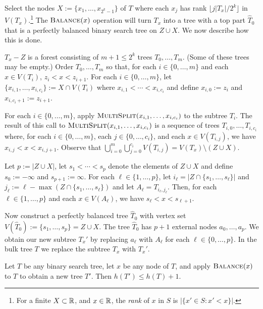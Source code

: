 \documentclass[kpfonts]{patmorin}
\let\le\leqslant
\begin{document}
Select the nodes $X:=\{x_1,\ldots,x_{2^k-1}\}$ of $T$ where each $x_j$ has rank $\lfloor j|T_x|/2^k\rfloor$ in $V(T_x)$.\footnote{For a finite $X\subset\mathbb{R}$, and $x\in\mathbb{R}$, the \emph{rank} of $x$ in $S$ is $|\{x'\in S: x'<x\}|$.}  The $\textsc{Balance}(x)$ operation will turn $T_x$ into a tree with a top part $\hat{T}_0$ that is a perfectly balanced binary search tree on $Z\cup X$.  We now describe how this is done.

$T_x-Z$ is a forest consisting of $m+1\le 2^{k}$ trees $T_0,\ldots,T_m$. (Some of these trees may be empty.)  Order $T_{0},\ldots,T_m$ so that, for each $i\in\{0,\ldots,m\}$ and each $x\in V(T_i)$, $z_i< x < z_{i+1}$.  For each $i\in\{0,\ldots,m\}$, let $\{x_{i,1},\ldots,x_{i,c_i}\}:=X\cap V(T_i)$ where $x_{i,1}<\cdots<x_{i,c_i}$ and define $x_{i,0}:=z_i$ and $x_{i,c_i+1}:=z_{i+1}$.

For each $i\in\{0,\ldots,m\}$, apply $\textsc{MultiSplit}(x_{i,1},\ldots,x_{i,c_i})$ to the subtree $T_i$.  The result of this call to $\textsc{MultiSplit}(x_{i,1},\ldots,x_{i,c_i})$ is a sequence of trees $T_{i,0},\ldots,T_{i,c_i}$ where, for each $i\in\{0,\ldots,m\}$, each $j\in\{0,\ldots,c_i\}$, and each $x\in V(T_{i,j})$, we have $x_{i,j}<x<x_{i,j+1}$.  Observe that $\bigcup_{i=0}^m\bigcup_{j=0}^{c_i} V(T_{i,j}) = V(T_x)\setminus (Z\cup X)$.

Let $p:=|Z\cup X|$, let $s_1<\cdots< s_p$ denote the elements of $Z\cup X$ and define $s_0:=-\infty$ and $s_{p+1}:=\infty$.  For each $\ell\in\{1,\ldots,p\}$, let $i_\ell=|Z\cap \{s_1,\ldots,s_\ell\}|$ and $j_\ell:=\ell-\max(Z\cap \{s_1,\ldots,s_\ell\})$ and let $A_\ell=T_{i_\ell,j_\ell}$.   Then, for each $\ell\in \{1,\ldots,p\}$ and each $x\in V(A_\ell)$, we have $s_\ell < x < s_{\ell+1}$.

Now construct a perfectly balanced tree $\hat{T}_0$ with vertex set $V(\hat{T}_0):=\{s_1,\ldots,s_p\}=Z\cup X$.  The tree $\hat{T}_0$ has $p+1$ external nodes $a_0,\ldots,a_p$.  We obtain our new subtree $T_x'$ by replacing $a_\ell$ with $A_\ell$ for each $\ell\in\{0,\ldots,p\}$.  In the bulk tree $T$ we replace the subtree $T_x$ with $T_x'$.

\begin{lem}
  Let $T$ be any binary search tree, let $x$ be any node of $T$, and apply $\textsc{Balance}(x)$ to $T$ to obtain a new tree $T'$.  Then $h(T')\le h(T)+1$.
\end{lem}
\end{document}
